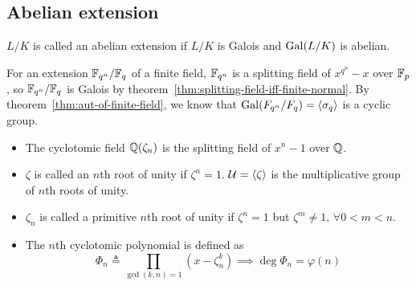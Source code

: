 \subsection{Abelian extension}

\begin{definition}
  $L/K$ is called an abelian extension if $L/K$ is Galois and $\operatorname{Gal}(L/K)$ is abelian.
\end{definition}

\begin{example}
  For an extension $\mathbb{F}_{q^n} / \mathbb{F}_q$ of a finite field, $\mathbb{F}_{q^n}$ is a splitting field of $x^{q^n}-x$
  over $\mathbb{F}_p$, so $\mathbb{F}_{q^n} / \mathbb{F}_q$ is Galois by theorem~\ref{thm:splitting-field-iff-finite-normal}.
  By theorem~\ref{thm:aut-of-finite-field}, we know that $\operatorname{Gal}(F_{q^n} / F_q) = \langle\sigma_q\rangle$
  is a cyclic group.
\end{example}

\begin{definition} \hfill
  \begin{itemize}
    \item The cyclotomic field $\mathbb{Q}(\zeta_n)$ is the splitting field of $x^n - 1$ over $\mathbb{Q}$.
    \item $\zeta$ is called an $n$th root of unity if $\zeta^n = 1$. $\mathcal{U} = \langle\zeta\rangle$
      is the multiplicative group of $n$th roots of unity.
    \item $\zeta_n$ is called a primitive $n$th root of unity if $\zeta^n = 1$ but
      $\zeta^m \ne 1, \, \forall 0 < m < n$.
    \item The $n$th cyclotomic polynomial is defined as
      \[ \Phi_n \triangleq \prod_{\gcd(k, n) = 1} (x - \zeta_n^k) \implies \deg \Phi_n = \varphi(n) \]
  \end{itemize}
\end{definition}

